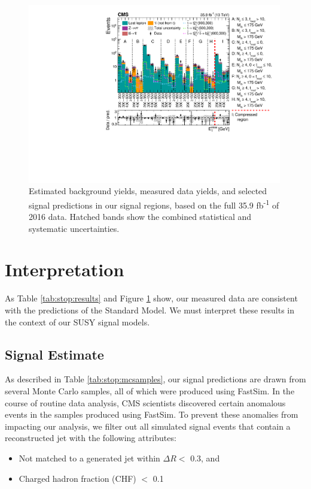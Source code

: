 \begin{figure}[htb]
\centering
\includegraphics[width=0.99\textwidth]{figures/ResultPlot_Moriond2017.pdf}
\caption{Estimated background yields, measured data yields, and
  selected signal predictions in our signal regions, based on the full
  35.9 fb\textsuperscript{-1} of 2016 data. Hatched bands show the
  combined statistical and systematic uncertainties.}
\label{fig:stop:results}
\end{figure}

\section{Interpretation}
\label{sec:stop:interp}

As Table \ref{tab:stop:results} and Figure \ref{fig:stop:results}
show, our measured data are consistent with the predictions of the
Standard Model. We must interpret these results in the context of our
SUSY signal models.

\subsection{Signal Estimate}
\label{ssec:stop:signal}

As described in Table \ref{tab:stop:mcsamples}, our signal predictions
are drawn from several Monte Carlo samples, all of which were produced
using FastSim. In the course of routine data analysis, CMS scientists discovered
certain anomalous events in the samples produced using FastSim. To
prevent these anomalies from impacting our analysis, we filter out all
simulated signal events that contain a reconstructed jet with the
following attributes:
\begin{itemize}
\item Not matched to a generated jet within $\Delta R <$ 0.3, and
\item Charged hadron fraction (CHF) $<$ 0.1
\end{itemize}

